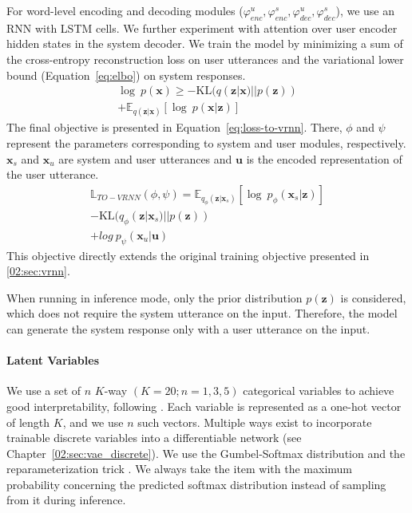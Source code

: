 For word-level encoding and decoding modules ($\varphi_{enc}^u,\varphi_{enc}^s,\varphi_{dec}^u,\varphi_{dec}^s$), we use an RNN with LSTM cells.
We further experiment with attention \cite{bahdanau2014neural} over user encoder hidden states in the system decoder.
We train the model by minimizing a sum of the cross-entropy reconstruction loss on user utterances and the variational lower bound (Equation~\ref{eq:elbo}) on system responses.
\begin{equation}
\begin{split}
    \log~p(\mathbf{x}) \ge -\mathrm{KL}(q(\mathbf{z}|\mathbf{x})||p(\mathbf{z}))\\ + \mathbb{E}_{q(\mathbf{z}|\mathbf{x})}[\log~p(\mathbf{x}|\mathbf{z})]
    \label{eq:elbo}
\end{split}
\end{equation}
The final objective is presented in Equation~\ref{eq:loss-to-vrnn}.
There, $\phi$ and $\psi$ represent the parameters corresponding to system and user modules, respectively. $\mathbf{x}_s$ and $\mathbf{x}_u$ are system and user utterances and $\mathbf{u}$ is the encoded representation of the user utterance.
\begin{equation}
\begin{split}
    \mathbb{L}_{TO-VRNN}(\phi,\psi) = \mathbb{E}_{q_{\phi}(\mathbf{z}|\mathbf{x}_s)}[\log~p_{\phi}(\mathbf{x}_s|\mathbf{z})] \\
    -\mathrm{KL}(q_{\phi}(\mathbf{z}|\mathbf{x}_s)||p(\mathbf{z}))\\
    + log~p_{\psi}(\mathbf{x}_u|\mathbf{u})
\end{split}
    \label{eq:loss-to-vrnn}
\end{equation}
This objective directly extends the original training objective presented in \ref{02:sec:vrnn}.

When running in inference mode, only the prior distribution $p(\mathbf{z})$ is considered, which does not require the system utterance on the input.
Therefore, the model can generate the system response only with a user utterance on the input.

\paragraph{Latent Variables}
\label{05:sec:method_latent}
We use a set of $n$ \mbox{$K$-way} $(K=20;n=1,3,5)$ categorical variables to achieve good interpretability, following \citet{zhao2018unsupervised}.
Each variable is represented as a one-hot vector of length $K$, and we use $n$ such vectors.
Multiple ways exist to incorporate trainable discrete variables into a differentiable network (see Chapter~\ref{02:sec:vae_discrete}).
We use the Gumbel-Softmax distribution and the reparameterization trick \cite{jang2017categorical}.
We always take the item with the maximum probability concerning the predicted softmax distribution instead of sampling from it during inference.

